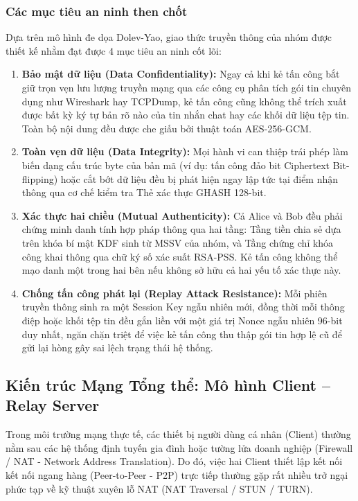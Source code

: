 \documentclass[a4paper,12pt]{article}
\begin{document}
\subsubsection{Các mục tiêu an ninh then chốt}
Dựa trên mô hình đe dọa Dolev-Yao, giao thức truyền thông của nhóm được thiết kế nhằm đạt được 4 mục tiêu an ninh cốt lõi:
\begin{enumerate}
    \item \textbf{Bảo mật dữ liệu (Data Confidentiality):} Ngay cả khi kẻ tấn công bắt giữ trọn vẹn lưu lượng truyền mạng qua các công cụ phân tích gói tin chuyên dụng như Wireshark hay TCPDump, kẻ tấn công cũng không thể trích xuất được bất kỳ ký tự bản rõ nào của tin nhắn chat hay các khối dữ liệu tệp tin. Toàn bộ nội dung đều được che giấu bởi thuật toán AES-256-GCM.
    \item \textbf{Toàn vẹn dữ liệu (Data Integrity):} Mọi hành vi can thiệp trái phép làm biến dạng cấu trúc byte của bản mã (ví dụ: tấn công đảo bit Ciphertext Bit-flipping) hoặc cắt bớt dữ liệu đều bị phát hiện ngay lập tức tại điểm nhận thông qua cơ chế kiểm tra Thẻ xác thực GHASH 128-bit.
    \item \textbf{Xác thực hai chiều (Mutual Authenticity):} Cả Alice và Bob đều phải chứng minh danh tính hợp pháp thông qua hai tầng: Tầng tiền chia sẻ dựa trên khóa bí mật KDF sinh từ MSSV của nhóm, và Tầng chứng chỉ khóa công khai thông qua chữ ký số xác suất RSA-PSS. Kẻ tấn công không thể mạo danh một trong hai bên nếu không sở hữu cả hai yếu tố xác thực này.
    \item \textbf{Chống tấn công phát lại (Replay Attack Resistance):} Mỗi phiên truyền thông sinh ra một Session Key ngẫu nhiên mới, đồng thời mỗi thông điệp hoặc khối tệp tin đều gắn liền với một giá trị Nonce ngẫu nhiên 96-bit duy nhất, ngăn chặn triệt để việc kẻ tấn công thu thập gói tin hợp lệ cũ để gửi lại hòng gây sai lệch trạng thái hệ thống.
\end{enumerate}

\subsection{Kiến trúc Mạng Tổng thể: Mô hình Client -- Relay Server}
Trong môi trường mạng thực tế, các thiết bị người dùng cá nhân (Client) thường nằm sau các hệ thống định tuyến gia đình hoặc tường lửa doanh nghiệp (Firewall / NAT - Network Address Translation). Do đó, việc hai Client thiết lập kết nối kết nối ngang hàng (Peer-to-Peer - P2P) trực tiếp thường gặp rất nhiều trở ngại phức tạp về kỹ thuật xuyên lỗ NAT (NAT Traversal / STUN / TURN).
\end{document}
